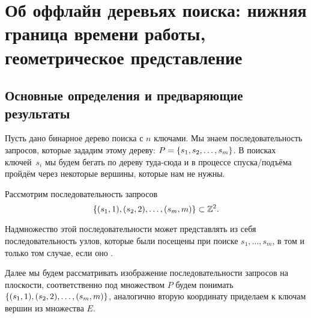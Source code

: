 \documentclass[a4paper,11pt]{article}
\begin{document}
\section{Об оффлайн деревьях поиска: нижняя граница времени работы, геометрическое представление}

\subsection{Основные определения и предваряющие результаты}

Пусть дано бинарное дерево поиска с $n$ ключами. Мы знаем последовательность запросов, которые зададим этому дереву: $P = \lbrace s_1,s_2,\ldots,s_m\rbrace$. В поисках ключей~$s_i$ мы будем бегать по дереву туда-сюда и в процессе спуска/подъёма пройдём через некоторые вершины, которые нам не нужны.




\begin{theorem}
	Рассмотрим последовательность запросов
	\begin{equation*}
		\lbrace(s_1,1),(s_2,2),\ldots,(s_m,m)\rbrace \subset {\mathbb Z}^2.
	\end{equation*}

	Надмножество этой последовательности может представлять из себя последовательность узлов, которые были посещены при поиске $s_1, \ldots, s_m$, в том и только том случае, если оно \arbs.
\end{theorem}



Далее мы будем рассматривать изображение последовательности запросов на плоскости, соответственно под множеством $P$ будем понимать $\lbrace(s_1,1),(s_2,2),\ldots,(s_m,m)\rbrace$, аналогично вторую координату приделаем к ключам вершин из множества $E$.
\end{document}
